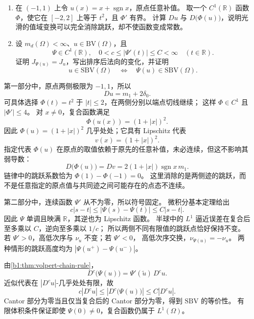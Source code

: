 \begin{exercise}\label{b1:ex:28-chain-jump-cancellation}
\begin{enumerate}
\item\label{b1:item:28-chain-square-cancellation}
在 \((-1,1)\) 上令 \(u(x)=x+\operatorname{sgn}x\)，原点任意补值。
取一个 \(C^1(\mathbb R)\) 函数 \(\Phi\)，使它在 \([-2,2]\) 上等于 \(t^2\)，且 \(\Phi'\) 有界。
计算 \(Du\) 与 \(D\bigl(\Phi(u)\bigr)\)，说明光滑的值域变换可以完全消除跳跃，却不使函数变成常数。
\item\label{b1:item:28-bilipschitz-value-change}
设 \(m_d(\Omega)<\infty\)、\(u\in \mathrm{BV}(\Omega)\)，且
\[
 \Psi\in C^1(\mathbb R),\quad
 0<c\le|\Psi'(t)|\le C<\infty\quad(t\in\mathbb R).
\]
证明 \(J_{\Psi(u)}=J_u\)，写出排序后法向的变化，并证明
\[
 u\in \mathrm{SBV}(\Omega)\quad\Longleftrightarrow\quad
 \Psi(u)\in \mathrm{SBV}(\Omega).
\]
\end{enumerate}
\end{exercise}
\begin{solution}
第一部分中，原点两侧极限为 \(-1,1\)，所以
\[
 Du=m_1+2\delta_0.
\]
可具体选择 \(\Phi(t)=t^2\) 于 \(|t|\le2\)，在两侧分别以端点切线继续；
这样 \(\Phi\in C^1\) 且 \(|\Phi'|\le4\)。
对 \(x\ne0\)，复合函数满足
\[
 \Phi(u(x))=(1+|x|)^2.
\]
因此 \(\Phi(u)=(1+|x|)^2\) 几乎处处；它具有 Lipschitz 代表
\[
 v(x)=(1+|x|)^2.
\]
指定代表 \(\Phi(u)\) 在原点的取值依赖于原先的任意补值，未必连续，但这不影响其弱导数：
\[
 D\bigl(\Phi(u)\bigr)
 =Dv
 =2(1+|x|)\operatorname{sgn}x\,m_1.
\]
链律中的跳跃系数恰为 \(\Phi(1)-\Phi(-1)=0\)。
这里消除的是两侧迹的跳跃，而不是任意指定的原点值与共同迹之间可能存在的点态不连续。

第二部分中，连续函数 \(\Psi'\) 从不为零，所以符号固定。
微积分基本定理给出
\[
 c|s-t|\le|\Psi(s)-\Psi(t)|\le C|s-t|.
\]
因此 \(\Psi\) 单调且映满 \(\mathbb R\)，其逆也为 Lipschitz 函数。
半球中的 \(L^1\) 逼近误差在复合后至多乘以 \(C\)，逆向至多乘以 \(1/c\)；
所以两侧不同有限值的跳跃点恰好保持不变。
若 \(\Psi'>0\)，高低次序与 \(\nu_u\) 不变；若 \(\Psi'<0\)，
高低次序交换，\(\nu_{\Psi(u)}=-\nu_u\)。
两种情形的跳跃高度均为 \(|\Psi(u^+)-\Psi(u^-)|\)。

由\cref{b1:thm:volpert-chain-rule}，
\[
 D^c\bigl(\Psi(u)\bigr)=\Psi'(\widetilde u)\,D^cu.
\]
近似代表在 \(|D^cu|\)-几乎处处有限，故
\[
 c|D^cu|\le |D^c\bigl(\Psi(u)\bigr)|\le C|D^cu|.
\]
Cantor 部分为零当且仅当复合后的 Cantor 部分为零，得到 \(\mathrm{SBV}\) 的等价性。
有限体积条件保证即使 \(\Psi(0)\ne0\)，复合函数仍属于 \(L^1(\Omega)\)。
\end{solution}

